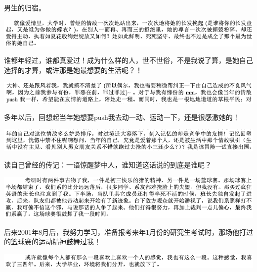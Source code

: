 \documentclass[9pt, b5paper]{article}
\begin{document}
男生的归宿。

\begin{center}
\includegraphics[width=.9\linewidth]{./pic/backups_plans_20210422_103824.png}
\end{center}

谁都年轻过，谁都真爱过！成为什么样的人，世不世俗，不是我说了算，是她自己选择的才算，或许那是她最想要的生活呢？！

\begin{center}
\includegraphics[width=.9\linewidth]{./pic/backups_plans_20210422_104325.png}
\end{center}

多年以后，回想起当年她想要push我去动一动、运动一下，还是很感激她的！

\begin{center}
\includegraphics[width=.9\linewidth]{./pic/backups_plans_20210422_103627.png}
\end{center}

读自己曾经的传记：一语惊醒梦中人，谁知道这话说的到底是谁呢？

\begin{center}
\includegraphics[width=.9\linewidth]{./pic/backups_plans_20210422_095539.png}
\end{center}

后来2001年8月后，我努力学习，准备报考来年1月份的研究生考试时，那场他打过的篮球赛的运动精神鼓舞过我！

\begin{center}
\includegraphics[width=.9\linewidth]{./pic/backups_plans_20210422_095607.png}
\end{center}
\end{document}
